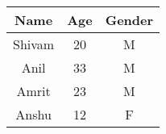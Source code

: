 \documentclass[12pt]{article}
\begin{document}
\begin{tabular}{|c|c|c|}  \hline
Name & Age & Gender \\ \hline \hline 
Shivam & 20 & M \\
Anil & 33 & M \\
Amrit & 23 & M \\
Anshu & 12 & F \\ \hline 
\end{tabular}
\end{document}
